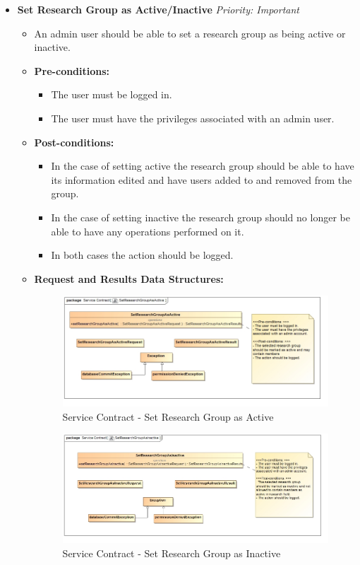 \documentclass{article}
\begin{document}
\begin{itemize}
					\cleardoublepage
					\item \textbf{Set Research Group as Active/Inactive} \hfill \textit{Priority: Important}
					\begin{itemize}
						\item An admin user should be able to set a research group as being active or inactive.
						\item \textbf{Pre-conditions:}
						\begin{itemize}
							\item The user must be logged in.
							\item The user must have the privileges associated with an admin user.
						\end{itemize}
						\item \textbf{Post-conditions:}
						\begin{itemize}
							\item In the case of setting active the research group should be able to have its information edited and have users added to and removed from the group.
							\item In the case of setting inactive the research group should no longer be able to have any operations performed on it.
							\item In both cases the action should be logged.
						\end{itemize}
						\item \textbf{Request and Results Data Structures:}
						\begin{figure}[H]
							\includegraphics[width=\linewidth]{../Diagrams/ServiceContracts/Group control subsystem/SetResearchGroupAsActive.jpg}
							\caption{Service Contract - Set Research Group as Active}
						\end{figure}
						\begin{figure}[H]
							\includegraphics[width=\linewidth]{../Diagrams/ServiceContracts/Group control subsystem/SetResearchGroupAsInactive.jpg}
							\caption{Service Contract - Set Research Group as Inactive}
						\end{figure}
					\end{itemize}


\end{itemize}
\end{document}
